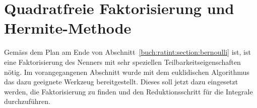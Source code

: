 %
%
%
\section{Quadratfreie Faktorisierung und Hermite-Methode
\label{buch:ratint:section:hermite}}
%
Gemäss dem Plan am Ende von Abschnitt~\ref{buch:ratint:section:bernoulli}
ist, ist eine Faktorisierung des Nenners mit sehr speziellen
Teilbarkeitseigenschaften nötig.
Im vorangegangenen Abschnitt wurde mit dem euklidischen Algorithmus
das dazu geeignete Werkzeug bereitgestellt.
Dieses soll jetzt dazu eingesetzt werden, die Faktorisierung zu
finden und den Reduktionsschritt für die Integrale durchzuführen.



%
